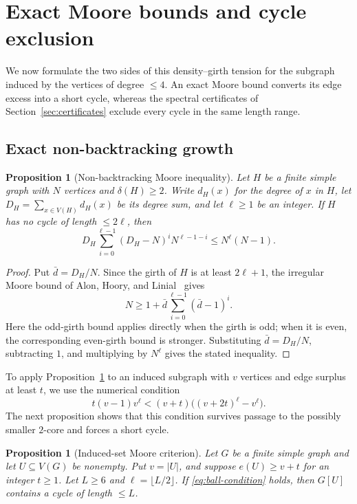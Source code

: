 \documentclass[11pt]{article}
\numberwithin{equation}{section}
\newtheorem{proposition}[theorem]{Proposition}
\theoremstyle{definition}
\theoremstyle{remark}
\begin{document}
\section{Exact Moore bounds and cycle exclusion}\label{sec:cycles}

We now formulate the two sides of this density--girth tension for the subgraph
induced by the vertices of degree \(\le4\).  An exact Moore bound converts its
edge excess into a short cycle, whereas the spectral certificates of
Section~\ref{sec:certificates} exclude every cycle in the same length range.

\subsection{Exact non-backtracking growth}

\begin{proposition}[Non-backtracking Moore inequality]\label{lem:nb-moore}
Let \(H\) be a finite simple graph with \(N\) vertices and \(\delta(H)\ge2\).
Write \(d_H(x)\) for the degree of \(x\) in \(H\), let
\(D_H=\sum_{x\in V(H)}d_H(x)\) be its degree sum, and let \(\ell\ge1\) be an
integer.  If \(H\) has no cycle of length \(\le2\ell\), then
\[
 D_H\sum_{i=0}^{\ell-1}(D_H-N)^iN^{\ell-1-i}\le N^\ell(N-1).
\]
\end{proposition}

\begin{proof}
Put \(\bar d=D_H/N\).  Since the girth of \(H\) is at least
\(2\ell+1\), the irregular Moore bound of Alon, Hoory, and
Linial~\cite{ahl2002} gives
\[
 N\ge 1+\bar d\sum_{i=0}^{\ell-1}(\bar d-1)^i.
\]
Here the odd-girth bound applies directly when the girth is odd; when it is
even, the corresponding even-girth bound is stronger.  Substituting
\(\bar d=D_H/N\), subtracting \(1\), and multiplying by \(N^\ell\) gives the
stated inequality.
\end{proof}

To apply Proposition~\ref{lem:nb-moore} to an induced subgraph with \(v\)
vertices and edge surplus at least \(t\), we use the numerical condition
\begin{equation}\label{eq:ball-condition}
 t(v-1)v^\ell<(v+t)\bigl((v+2t)^\ell-v^\ell\bigr).
\end{equation}
The next proposition shows that this condition survives passage to the
possibly smaller \(2\)-core and forces a short cycle.

\begin{proposition}[Induced-set Moore criterion]\label{prop:nb-induced-cycle}
Let \(G\) be a finite simple graph and let \(U\subseteq V(G)\) be nonempty.
Put \(v=|U|\), and suppose \(e(U)\ge v+t\) for an integer \(t\ge1\).  Let \(L\ge6\) and
\(\ell=\lfloor L/2\rfloor\).  If \eqref{eq:ball-condition} holds, then
\(G[U]\) contains a cycle of length \(\le L\).
\end{proposition}
\end{document}

